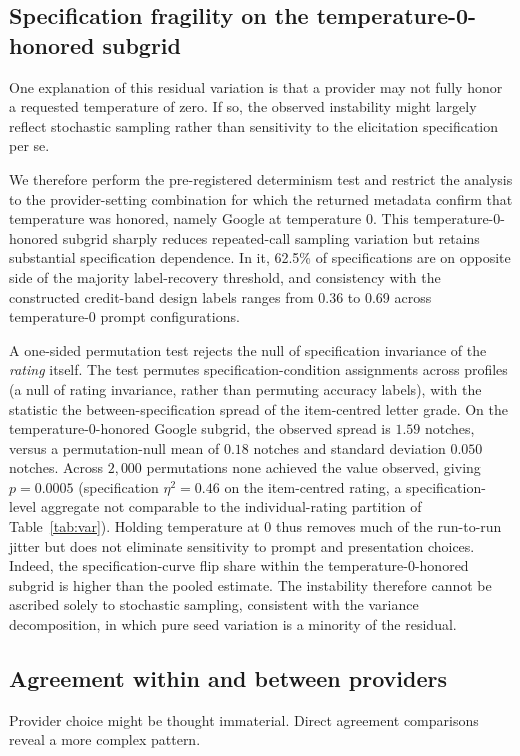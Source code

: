 \documentclass[a4paper,fleqn]{cas-sc}
\begin{document}
\subsection{Specification fragility on the temperature-0-honored subgrid}
One explanation of this residual variation is that a provider may not fully honor a requested
temperature of zero. If so, the observed instability might largely reflect stochastic sampling rather
than sensitivity to the elicitation specification per se.

We therefore perform the pre-registered determinism test and restrict the analysis to the
provider-setting combination for which the returned metadata confirm that temperature was honored, namely Google
at temperature 0. This temperature-0-honored subgrid sharply reduces repeated-call sampling variation but
retains substantial specification dependence. In it, 62.5\% of specifications are on opposite side of the majority
label-recovery threshold, and consistency with the constructed credit-band design labels ranges from 0.36 to
0.69 across temperature-0 prompt configurations.

A one-sided permutation test rejects the null of specification invariance of the \emph{rating} itself.
The test permutes specification-condition assignments across profiles (a null of rating invariance, rather
than permuting accuracy labels), with the statistic the between-specification spread of the item-centred
letter grade. On the temperature-0-honored Google subgrid, the observed spread is $1.59$ notches, versus
a permutation-null mean of $0.18$ notches and standard deviation $0.050$ notches. Across $2{,}000$ permutations
none achieved the value observed, giving $p=0.0005$ (specification $\eta^2=0.46$ on the item-centred
rating, a specification-level aggregate not comparable to the individual-rating partition of
Table~\ref{tab:var}). Holding temperature at 0 thus removes much of the run-to-run jitter but does not eliminate
sensitivity to prompt and presentation choices. Indeed, the specification-curve flip share within the
temperature-0-honored subgrid is higher than the pooled estimate. The instability therefore cannot be ascribed
solely to stochastic sampling, consistent with the variance decomposition, in which pure seed variation
is a minority of the residual.

\subsection{Agreement within and between providers}\label{sec:agreement}
Provider choice might be thought immaterial. Direct agreement
comparisons reveal a more complex pattern.
\end{document}
